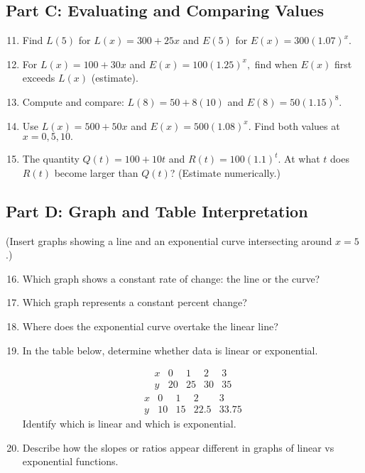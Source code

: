 \documentclass[12pt]{article}
\begin{document}
\subsection*{Part C: Evaluating and Comparing Values}
\begin{enumerate}
  \setcounter{enumi}{10}
  \item Find \(L(5)\) for \(L(x) = 300 + 25x\) and \(E(5)\) for \(E(x) = 300(1.07)^x.\)
  \item For \(L(x) = 100 + 30x\) and \(E(x) = 100(1.25)^x,\) find when \(E(x)\) first exceeds \(L(x)\) (estimate).
  \item Compute and compare:  
  \(L(8) = 50 + 8(10)\) and \(E(8) = 50(1.15)^8.\)
  \item Use \(L(x) = 500 + 50x\) and \(E(x) = 500(1.08)^x.\)  
  Find both values at \(x = 0, 5, 10.\)
  \item The quantity \(Q(t) = 100 + 10t\) and \(R(t) = 100(1.1)^t.\)  
  At what \(t\) does \(R(t)\) become larger than \(Q(t)\)? (Estimate numerically.)
\end{enumerate}

\subsection*{Part D: Graph and Table Interpretation}
(Insert graphs showing a line and an exponential curve intersecting around \(x=5\).)
\begin{enumerate}
  \setcounter{enumi}{15}
  \item Which graph shows a constant rate of change: the line or the curve?
  \item Which graph represents a constant percent change?
  \item Where does the exponential curve overtake the linear line?
  \item In the table below, determine whether data is linear or exponential.  

  \[
  \begin{array}{c|cccc}
  x & 0 & 1 & 2 & 3 \\ \hline
  y & 20 & 25 & 30 & 35
  \end{array}
  \]
  \[
  \begin{array}{c|cccc}
  x & 0 & 1 & 2 & 3 \\ \hline
  y & 10 & 15 & 22.5 & 33.75
  \end{array}
  \]
  Identify which is linear and which is exponential.
  \item Describe how the slopes or ratios appear different in graphs of linear vs exponential functions.
\end{enumerate}
\end{document}
